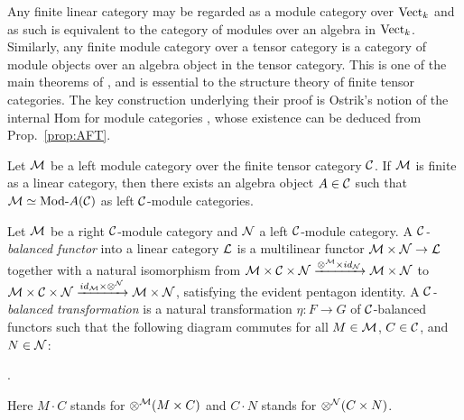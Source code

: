 \documentclass[a4paper]{amsart}
\begin{document}
Any finite linear category may be regarded as a module category over $\mathrm{Vect}_k$ and as such is equivalent to the category of modules over an algebra in $\mathrm{Vect}_k$. Similarly, any finite module category over a tensor category is a category of module objects over an algebra object in the tensor category.
This is one of the main theorems of \cite{EGNO}, and is essential to the structure theory of finite tensor categories.  The key construction underlying their proof is Ostrik's notion of the internal Hom for module categories \cite{MR1976459}, whose existence can be deduced from Prop.~\ref{prop:AFT}.

\begin{theorem} \label{thm:EGNO2.11.6} %
	Let $\mathcal M$ be a left module category over the finite tensor category $\mathcal C$. If $\mathcal M$ is finite as a linear category, then there exists an algebra object $A \in \mathcal C$ such that $\cM \simeq \Mod{}{A} (\cC)$ as left $\mathcal C$-module categories. 
\end{theorem}

\begin{definition}
	Let $\mathcal M$ be a right $\mathcal C$-module category and $\mathcal N$ a left $\mathcal C$-module category. A {\em $\mathcal C$-balanced functor} into a linear category $\mathcal L$ is a multilinear functor $\mathcal M \times \mathcal N \to \mathcal L$ together with a natural isomorphism from $\mathcal M \times \mathcal C \times \mathcal N \xrightarrow{\otimes^{\mathcal M} \times id_{\mathcal N}} \mathcal M \times \mathcal N$ to $\mathcal M \times \mathcal C \times \mathcal N \xrightarrow{id_{\mathcal M} \times \otimes^{\mathcal N}} \mathcal M \times \mathcal N$, satisfying the evident pentagon identity. A {\em $\mathcal C$-balanced transformation} is a natural transformation $\eta:F \to G$ of $\mathcal C$-balanced functors such that the following diagram commutes for all $M \in \mathcal M$, $C \in \mathcal C$, and $N \in \mathcal N$:
\begin{center}
.
\end{center}
\nid Here $M \cdot C$ stands for $\otimes^{\mathcal M}(M \times C)$ and $C \cdot N$ stands for $\otimes^{\mathcal N}(C \times N)$.
\end{definition}
\end{document}
